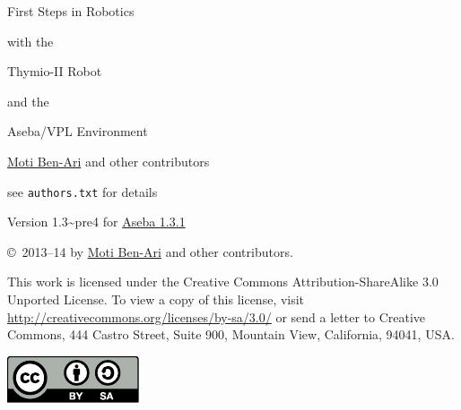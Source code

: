 
\thispagestyle{empty}

\begin{center}
\begin{Huge}
\begin{bfseries}
First Steps in Robotics
\end{bfseries}

with the

\begin{bfseries}
Thymio-II Robot
\end{bfseries}

and the

\begin{bfseries}
Aseba/VPL Environment
\end{bfseries}

\end{Huge}

\vskip 2cm

\begin{LARGE}
\href{http://www.weizmann.ac.il/sci-tea/benari/}{Moti Ben-Ari} and other contributors\\
\end{LARGE}
\bigskip
\begin{Large}
see \texttt{authors.txt} for details
\end{Large}

\vskip 1cm

\begin{Large}
Version 1.3{\textasciitilde}pre4 for \href{https://aseba.wikidot.com/en:downloadinstall}{Aseba 1.3.1}
\end{Large}

\end{center}

\vfill

\begin{center}
\copyright{}\  2013--14 by \href{http://www.weizmann.ac.il/sci-tea/benari/}{Moti Ben-Ari} and other contributors.
\end{center}

This work is licensed under the Creative Commons
Attribution-ShareAlike 3.0 Unported License. To view a copy
of this license, visit
\url{http://creativecommons.org/licenses/by-sa/3.0/}
or send a letter to Creative Commons, 444 Castro Street, Suite 900,
Mountain View, California, 94041, USA.

\begin{center}
\includegraphics[width=.2\textwidth]{../images/by-sa}
\end{center}

\newpage
\tableofcontents
\thispagestyle{empty}
\newpage
\setcounter{page}{1}
